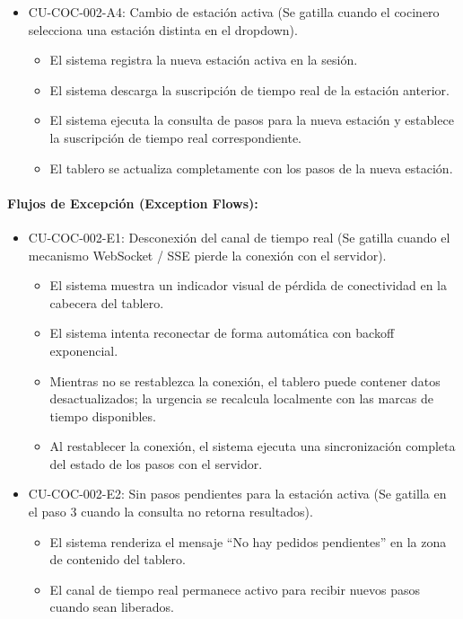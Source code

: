 \begin{itemize}
\begin{itemize}
    \end{itemize}
    \item CU-COC-002-A4: Cambio de estación activa (Se gatilla cuando el cocinero selecciona una estación distinta en el dropdown).
    \begin{itemize}
        \item El sistema registra la nueva estación activa en la sesión.
        \item El sistema descarga la suscripción de tiempo real de la estación anterior.
        \item El sistema ejecuta la consulta de pasos para la nueva estación y establece la suscripción de tiempo real correspondiente.
        \item El tablero se actualiza completamente con los pasos de la nueva estación.
    \end{itemize}
\end{itemize}

\paragraph{Flujos de Excepción (Exception Flows):}
\begin{itemize}
    \item CU-COC-002-E1: Desconexión del canal de tiempo real (Se gatilla cuando el mecanismo WebSocket / SSE pierde la conexión con el servidor).
    \begin{itemize}
        \item El sistema muestra un indicador visual de pérdida de conectividad en la cabecera del tablero.
        \item El sistema intenta reconectar de forma automática con backoff exponencial.
        \item Mientras no se restablezca la conexión, el tablero puede contener datos desactualizados; la urgencia se recalcula localmente con las marcas de tiempo disponibles.
        \item Al restablecer la conexión, el sistema ejecuta una sincronización completa del estado de los pasos con el servidor.
    \end{itemize}
    \item CU-COC-002-E2: Sin pasos pendientes para la estación activa (Se gatilla en el paso 3 cuando la consulta no retorna resultados).
    \begin{itemize}
        \item El sistema renderiza el mensaje ``No hay pedidos pendientes'' en la zona de contenido del tablero.
        \item El canal de tiempo real permanece activo para recibir nuevos pasos cuando sean liberados.
    \end{itemize}
\end{itemize}

